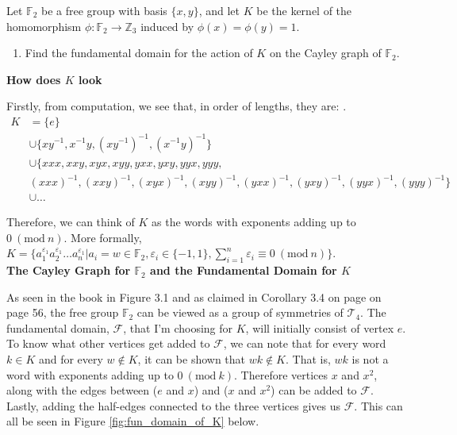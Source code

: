 \documentclass[12pt]{article}%
\newcommand{\F}{\mathbb{F}}
\newcommand{\Z}{\mathbb{Z}}
\newcommand{\Mod}[1]{\ (\mathrm{mod}\ #1)}
\begin{document}
Let $\F_2$ be a free group with basis $\{x,y\}$, and let $K$
 be the kernel of the homomorphism $\phi:\F_2\rightarrow \Z_3$ induced by $\phi(x)=\phi(y)=1$.

\renewcommand{\labelenumi}{\alph{enumi}}
\begin{enumerate}
  \item Find the fundamental domain for the action of $K$ on the Cayley graph of $\F_2$.
\end{enumerate}

\textbf{How does $K$ look}

Firstly, from computation, we see that, in order of lengths, they are: . 
\begin{align*}
K
&=\{e\} \\
&\cup\{xy^{-1}, x^{-1}y, (xy^{-1})^{-1}, (x^{-1}y)^{-1}\} \\
&\cup\{xxx,xxy,xyx,xyy,yxx,yxy,yyx,yyy, \\
&(xxx)^{-1},(xxy)^{-1},(xyx)^{-1},(xyy)^{-1},(yxx)^{-1},(yxy)^{-1},(yyx)^{-1},(yyy)^{-1}\} \\
&\cup \ldots
\end{align*}


Therefore, we can think of $K$ as the words with exponents adding up to $0 \Mod{n}$. More formally, $K=\{a_{1}^{\varepsilon_1}a_{2}^{\varepsilon_1}\ldots a_{n}^{\varepsilon_1} | a_i=w\in \F_2, \varepsilon_i\in \{-1, 1\}, \sum_{i=1}^{n} \varepsilon_i \equiv 0 \Mod{n}\}$. \\

\textbf{The Cayley Graph for $\F_2$ and the Fundamental Domain for $K$}

As seen in the book in Figure 3.1 and as claimed in Corollary 3.4 on page on page 56, the free group $\F_2$ can be viewed as a group of symmetries of $\mathcal{T}_4$. The fundamental domain, $\mathcal{F}$, that I'm choosing for $K$, will initially consist of vertex $e$. To know what other vertices get added to $\mathcal{F}$, we can note that for every word $k\in K$ and for every $w\not\in K$, it can be shown that $wk\not\in K$. That is, $wk$ is not a word with exponents adding up to $0\Mod{k}$. Therefore vertices $x$ and $x^2$, along with the edges between ($e$ and $x$) and ($x$ and $x^2$) can be added to $\mathcal{F}$. Lastly, adding the half-edges connected to the three vertices gives us $\mathcal{F}$. This can all be seen in Figure \ref{fig:fun_domain_of_K} below.
\end{document}
